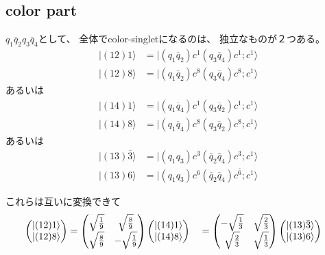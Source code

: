 \documentclass[a4j]{jarticle}
\def\ket{\rangle}
\def\qbar{\overline{{q}}}
\begin{document}
\subsection{color part}

$q_1\qbar_2q_3\qbar_4$として、
全体でcolor-singletになるのは、
独立なものが２つある。
\begin{align}
|(12)1\ket&=|(q_1\qbar_2)c^1(q_3\qbar_4)c^1;c^1\ket
\\
|(12)8\ket&=|(q_1\qbar_2)c^8(q_3\qbar_4)c^8;c^1\ket
\end{align}
あるいは
\begin{align}
|(14)1\ket&=|(q_1\qbar_4)c^1(q_3\qbar_2)c^1;c^1\ket
\\
|(14)8\ket&=|(q_1\qbar_4)c^8(q_3\qbar_2)c^8;c^1\ket
\end{align}
あるいは
\begin{align}
|(13)\bar3\ket&=|(q_1q_3)c^{\bar3}(\qbar_2\qbar_4)c^3;c^1\ket
\\
|(13)6\ket&=|(q_1q_3)c^6(\qbar_2\qbar_4)c^{\bar6};c^1\ket
\end{align}

これらは互いに変換できて
\begin{align}
\begin{pmatrix}
|(12)1\ket
\\
|(12)8\ket
\end{pmatrix}
&=
\begin{pmatrix}
\sqrt{1\over 9}& \sqrt{8\over 9}
\\
\sqrt{8\over 9}&-\sqrt{1\over 9}
\end{pmatrix}
\begin{pmatrix}
|(14)1\ket
\\
|(14)8\ket
\end{pmatrix}
&&=
\begin{pmatrix}
-\sqrt{1\over 3}& \sqrt{2\over 3}
\\
\sqrt{2\over 3}& \sqrt{1\over 3}
\end{pmatrix}
\begin{pmatrix}
|(13)\bar3\ket
\\
|(13)6\ket
\end{pmatrix}
\end{align}
\end{document}
